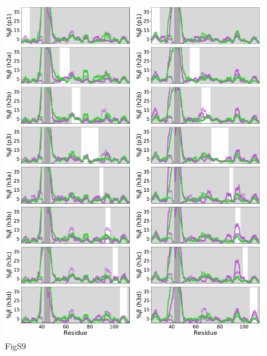 \documentclass[10pt,letterpaper]{article}
\begin{document}
\begin{figure}[!ht]
\includegraphics[scale=0.5,width=\textwidth,trim={0 0cm 0 0cm},clip]{./figures/S9.pdf}
\caption{{FigS9}}
\end{figure}
\end{document}
